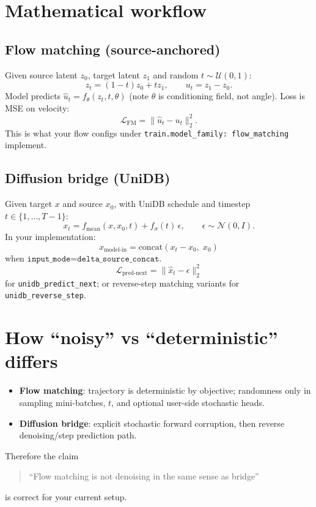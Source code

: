 \documentclass[11pt]{article}
\begin{document}
\section{Mathematical workflow}
\subsection{Flow matching (source-anchored)}
Given source latent \(z_0\), target latent \(z_1\) and random \(t\sim \mathcal U(0,1)\):
\[
z_t = (1-t)z_0 + tz_1,\qquad
u_t = z_1 - z_0.
\]
Model predicts \(\hat{u}_t = f_\theta(z_t,t,\theta)\) (note \(\theta\) is conditioning field, not angle). Loss is MSE on velocity:
\[
\mathcal L_{\text{FM}} = \| \hat{u}_t - u_t\|_2^2.
\]
This is what your flow configs under \texttt{train.model\_family: flow\_matching} implement.

\subsection{Diffusion bridge (UniDB)}
Given target \(x\) and source \(x_0\), with UniDB schedule and timestep \(t\in\{1,\dots,T-1\}\):
\[
x_t = f_{\text{mean}}(x, x_0,t) + f_\sigma(t)\,\epsilon,\qquad \epsilon\sim\mathcal N(0,I).
\]
In your implementation:
\[
x_{\text{model-in}} = \text{concat}(x_t - x_0,\; x_0)
\]
when \(\texttt{input\_mode=delta\_source\_concat}\).
\[
\mathcal L_{\text{pred-next}} = \|\hat{x}_t - \epsilon\|_2^2
\]
for \texttt{unidb\_predict\_next}; or reverse-step matching variants for \texttt{unidb\_reverse\_step}.

\section{How ``noisy'' vs ``deterministic'' differs}
\begin{itemize}
  \item \textbf{Flow matching}: trajectory is deterministic by objective; randomness only in sampling mini-batches, \(t\), and optional user-side stochastic heads.
  \item \textbf{Diffusion bridge}: explicit stochastic forward corruption, then reverse denoising/step prediction path.
\end{itemize}

Therefore the claim
\begin{quote}
``Flow matching is not denoising in the same sense as bridge''
\end{quote}
is correct for your current setup.
\end{document}
